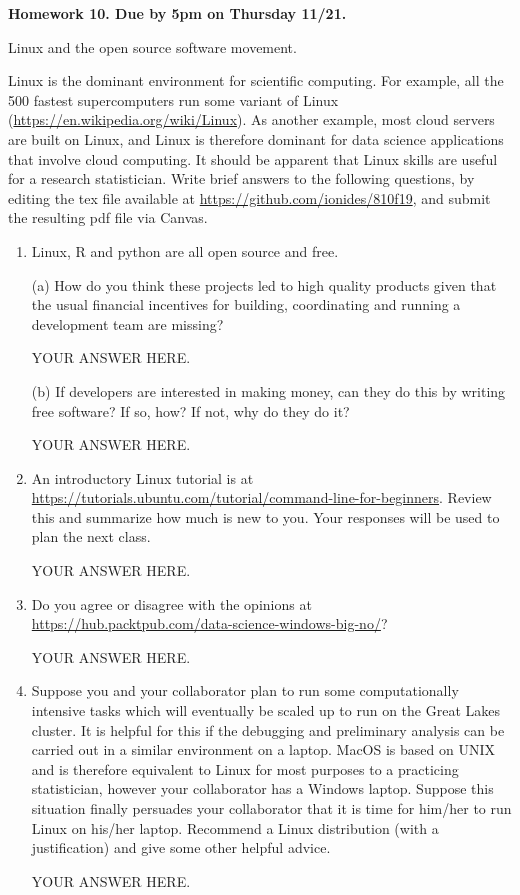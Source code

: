 \documentclass[12pt]{article}
\begin{document}
\begin{center}\bf
Homework 10. Due by 5pm on Thursday 11/21.

Linux and the open source software movement.

\end{center}

Linux is the dominant environment for scientific computing. For example, all the 500 fastest  supercomputers run some variant of Linux (\url{https://en.wikipedia.org/wiki/Linux}). As another example, most cloud servers are built on Linux, and Linux is therefore dominant for data science applications that involve cloud computing. It should be apparent that Linux skills are useful for a research statistician. Write brief answers to the following questions, by editing the tex file available at \url{https://github.com/ionides/810f19}, and submit the resulting pdf file via Canvas.

\begin{enumerate}

\item Linux, R and python are all open source and free. 

(a) How do you think these projects led to high quality products given that the  usual financial incentives for building, coordinating and running a development team are missing?

YOUR ANSWER HERE.

(b) If developers are interested in making money, can they do this by writing free software? If so, how? If not, why do they do it?

YOUR ANSWER HERE.

\item An introductory Linux tutorial is at\\
  \url{https://tutorials.ubuntu.com/tutorial/command-line-for-beginners}.
Review this and summarize how much is new to you. Your responses will be used to plan the next class.

YOUR ANSWER HERE.

\item Do you agree or disagree with the opinions at\\
  \url{https://hub.packtpub.com/data-science-windows-big-no/}? 

YOUR ANSWER HERE.

\item Suppose you and your collaborator plan to run some computationally intensive tasks which will eventually be scaled up to run on the Great Lakes cluster. It is helpful for this if the debugging and preliminary analysis can be carried out in a similar environment on a laptop.  MacOS is based on UNIX and is therefore equivalent to Linux for most purposes to a practicing statistician, however your collaborator has a Windows laptop. Suppose this situation finally persuades your collaborator that it is time for him/her to run Linux on his/her laptop. Recommend a Linux distribution (with a justification) and give some other helpful advice.

YOUR ANSWER HERE.

\end{enumerate}
\end{document}
